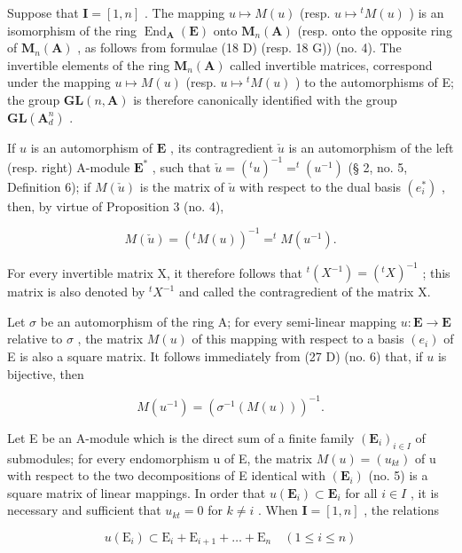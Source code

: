 Suppose that \(\mathbf{I} = [1, n]\) . The mapping \(u \mapsto M(u)\) (resp. \(u \mapsto {}^t M(u)\) ) is an isomorphism of the ring \(\operatorname{End}_{\mathbf{A}}(\mathbf{E})\) onto \(\mathbf{M}_n(\mathbf{A})\) (resp. onto the opposite ring of \(\mathbf{M}_n(\mathbf{A})\) , as follows from formulae (18 D) (resp. 18 G)) (no. 4). The invertible elements of the ring \(\mathbf{M}_{n}(\mathbf{A})\) called invertible matrices, correspond under the mapping \(u \mapsto M(u)\) (resp. \(u \mapsto {}^{t}M(u)\) ) to the automorphisms of E; the group \(\mathbf{GL}(n, \mathbf{A})\) is therefore canonically identified with the group \(\mathbf{GL}(\mathbf{A}_{d}^{n})\) .

If \(u\) is an automorphism of \(\mathbf{E}\) , its contragredient \(\check{u}\) is an automorphism of the left (resp. right) A-module \(\mathbf{E}^*\) , such that \(\check{u} = (^{t}u)^{-1} = ^{t}(u^{-1})\) (§ 2, no. 5, Definition 6); if \(M(\check{u})\) is the matrix of \(\check{u}\) with respect to the dual basis \((e_{i}^{*})\) , then, by virtue of Proposition 3 (no. 4),

\[
M (\check {u}) = (^ {t} M (u)) ^ {- 1} = ^ {t} M (u ^ {- 1}).\tag{29}
\]

For every invertible matrix X, it therefore follows that \({}^{t}(X^{-1}) = ({}^{t}X)^{-1}\) ; this matrix is also denoted by \({}^{t}X^{-1}\) and called the contragredient of the matrix X.

Let \(\sigma\) be an automorphism of the ring A; for every semi-linear mapping \(u: \mathbf{E} \to \mathbf{E}\) relative to \(\sigma\) , the matrix \(M(u)\) of this mapping with respect to a basis \((e_i)\) of E is also a square matrix. It follows immediately from (27 D) (no. 6) that, if \(u\) is bijective, then

\[
M (u ^ {- 1}) = (\sigma^ {- 1} (M (u))) ^ {- 1}.
\]

Let E be an A-module which is the direct sum of a finite family \((\mathbf{E}_{i})_{i\in I}\) of submodules; for every endomorphism u of E, the matrix \(M(u)=(u_{kt})\) of u with respect to the two decompositions of E identical with \((\mathbf{E}_{i})\) (no. 5) is a square matrix of linear mappings. In order that \(u(\mathbf{E}_{i})\subset\mathbf{E}_{i}\) for all \(i\in I\) , it is necessary and sufficient that \(u_{kt}=0\) for \(k\neq i\) . When \(\mathbf{I} = [1, n]\) , the relations

\[
u (\mathrm{E} _ {i}) \subset \mathrm{E} _ {i} + \mathrm{E} _ {i + 1} + \dots + \mathrm{E} _ {n} \quad (1 \leqslant i \leqslant n)
\]

